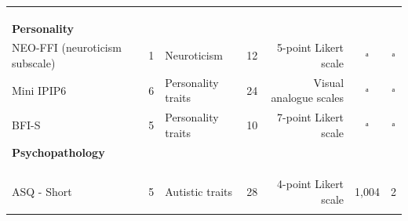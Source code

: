 \begin{table}
\begin{tabular*}{\linewidth}{@{\extracolsep{\fill}}lrlrrcc}
{\cellcolor[HTML]{FFF8E1}{PANAS}} & {\cellcolor[HTML]{FFF8E1}{2}} & {\cellcolor[HTML]{FFF8E1}{Positive and negative affect}} & {\cellcolor[HTML]{FFF8E1}{20}} & {\cellcolor[HTML]{FFF8E1}{5-point Likert scale}} & {\cellcolor[HTML]{FFF8E1}{392–396}} & {\cellcolor[HTML]{FFF8E1}{1}} \\ 
{\cellcolor[HTML]{FFF8E1}{LSAS}} & {\cellcolor[HTML]{FFF8E1}{2}} & {\cellcolor[HTML]{FFF8E1}{Social anxiety (fear and avoidance)}} & {\cellcolor[HTML]{FFF8E1}{48}} & {\cellcolor[HTML]{FFF8E1}{4-point Likert scale}} & {\cellcolor[HTML]{FFF8E1}{103}} & {\cellcolor[HTML]{FFF8E1}{1}} \\ 
{\cellcolor[HTML]{FFF8E1}{ASI-3}} & {\cellcolor[HTML]{FFF8E1}{1}} & {\cellcolor[HTML]{FFF8E1}{Anxiety sensitivity}} & {\cellcolor[HTML]{FFF8E1}{18}} & {\cellcolor[HTML]{FFF8E1}{5-point Likert scale}} & {\cellcolor[HTML]{FFF8E1}{60}} & {\cellcolor[HTML]{FFF8E1}{1}} \\ 
{\bfseries Personality} &  &  &  &  &  &  \\ 
NEO-FFI (neuroticism subscale) & 1 & Neuroticism & 12 & 5-point Likert scale & ᵃ & ᵃ \\ 
Mini IPIP6 & 6 & Personality traits & 24 & Visual analogue scales & ᵃ & ᵃ \\ 
BFI-S & 5 & Personality traits & 10 & 7-point Likert scale & ᵃ & ᵃ \\ 
{\bfseries Psychopathology} &  &  &  &  &  &  \\ 
{\cellcolor[HTML]{FFF8E1}{PID-5-SFF}} & {\cellcolor[HTML]{FFF8E1}{5}} & {\cellcolor[HTML]{FFF8E1}{Maladaptive personality traits}} & {\cellcolor[HTML]{FFF8E1}{25}} & {\cellcolor[HTML]{FFF8E1}{4-point Likert scale}} & {\cellcolor[HTML]{FFF8E1}{485}} & {\cellcolor[HTML]{FFF8E1}{1}} \\ 
{\cellcolor[HTML]{FFF8E1}{SPQ-BR}} & {\cellcolor[HTML]{FFF8E1}{9}} & {\cellcolor[HTML]{FFF8E1}{Schizotypy}} & {\cellcolor[HTML]{FFF8E1}{32}} & {\cellcolor[HTML]{FFF8E1}{5-point Likert scale}} & {\cellcolor[HTML]{FFF8E1}{485}} & {\cellcolor[HTML]{FFF8E1}{1}} \\ 
{\cellcolor[HTML]{FFF8E1}{MSI-BPD}} & {\cellcolor[HTML]{FFF8E1}{1}} & {\cellcolor[HTML]{FFF8E1}{Borderline personality disorder}} & {\cellcolor[HTML]{FFF8E1}{9}} & {\cellcolor[HTML]{FFF8E1}{Dichotomous (yes/no)}} & {\cellcolor[HTML]{FFF8E1}{442}} & {\cellcolor[HTML]{FFF8E1}{1}} \\ 
ASQ - Short & 5 & Autistic traits & 28 & 4-point Likert scale & 1,004 & 2 \\ 
{\cellcolor[HTML]{FFF8E1}{CATI}} & {\cellcolor[HTML]{FFF8E1}{1}} & {\cellcolor[HTML]{FFF8E1}{Autistic traits (total score)}} & {\cellcolor[HTML]{FFF8E1}{42}} & {\cellcolor[HTML]{FFF8E1}{5-point Likert scale}} & {\cellcolor[HTML]{FFF8E1}{519}} & {\cellcolor[HTML]{FFF8E1}{1}} \\ 

\end{tabular*}
\end{table}
